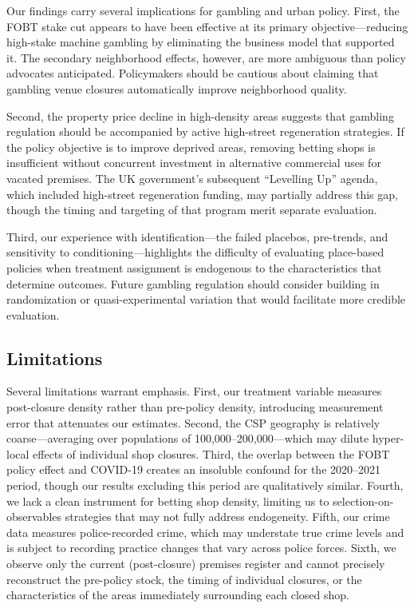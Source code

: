 \documentclass[12pt]{article}
\begin{document}
Our findings carry several implications for gambling and urban policy. First, the FOBT stake cut appears to have been effective at its primary objective---reducing high-stake machine gambling by eliminating the business model that supported it. The secondary neighborhood effects, however, are more ambiguous than policy advocates anticipated. Policymakers should be cautious about claiming that gambling venue closures automatically improve neighborhood quality.

Second, the property price decline in high-density areas suggests that gambling regulation should be accompanied by active high-street regeneration strategies. If the policy objective is to improve deprived areas, removing betting shops is insufficient without concurrent investment in alternative commercial uses for vacated premises. The UK government's subsequent ``Levelling Up'' agenda, which included high-street regeneration funding, may partially address this gap, though the timing and targeting of that program merit separate evaluation.

Third, our experience with identification---the failed placebos, pre-trends, and sensitivity to conditioning---highlights the difficulty of evaluating place-based policies when treatment assignment is endogenous to the characteristics that determine outcomes. Future gambling regulation should consider building in randomization or quasi-experimental variation that would facilitate more credible evaluation.

\subsection{Limitations}

Several limitations warrant emphasis. First, our treatment variable measures post-closure density rather than pre-policy density, introducing measurement error that attenuates our estimates. Second, the CSP geography is relatively coarse---averaging over populations of 100,000--200,000---which may dilute hyper-local effects of individual shop closures. Third, the overlap between the FOBT policy effect and COVID-19 creates an insoluble confound for the 2020--2021 period, though our results excluding this period are qualitatively similar. Fourth, we lack a clean instrument for betting shop density, limiting us to selection-on-observables strategies that may not fully address endogeneity. Fifth, our crime data measures police-recorded crime, which may understate true crime levels and is subject to recording practice changes that vary across police forces. Sixth, we observe only the current (post-closure) premises register and cannot precisely reconstruct the pre-policy stock, the timing of individual closures, or the characteristics of the areas immediately surrounding each closed shop.
\end{document}
